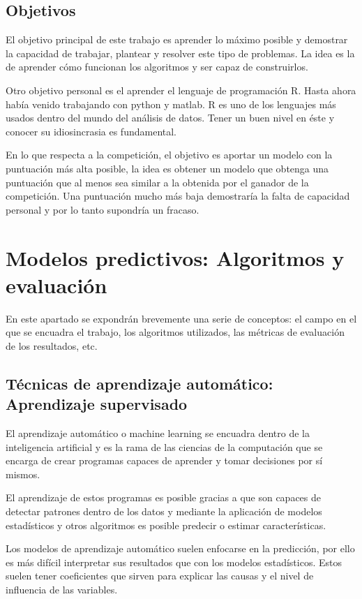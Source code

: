 \documentclass[11pt,a4paper,spanish]{article} %
\begin{document}
\subsection{Objetivos}
El objetivo principal de este trabajo es aprender lo máximo posible y demostrar la capacidad de trabajar, plantear y resolver este tipo de problemas. La idea es la de aprender cómo funcionan los algoritmos y ser capaz de construirlos. 

Otro objetivo personal es el aprender el lenguaje de programación R. Hasta ahora había venido trabajando con python y matlab. R es uno de los lenguajes más usados dentro del mundo del análisis de datos. Tener un buen nivel en éste y conocer su idiosincrasia es fundamental. 

En lo que respecta a la competición, el objetivo es aportar un modelo con la puntuación más alta posible, la idea es obtener un modelo que obtenga una puntuación que al menos sea similar a la obtenida por el ganador de la competición. Una puntuación mucho más baja demostraría la falta de capacidad personal y por lo tanto supondría un fracaso. 


\section{Modelos predictivos: Algoritmos y evaluación}

En este apartado se expondrán brevemente una serie de conceptos: el campo en el que se encuadra el trabajo, los algoritmos utilizados, las métricas de evaluación de los resultados, etc.


\subsection{Técnicas de aprendizaje automático: Aprendizaje supervisado}
El aprendizaje automático o machine learning se encuadra dentro de la inteligencia artificial y es la rama de las ciencias de la computación que se encarga de crear programas capaces de aprender y tomar decisiones por sí mismos. 

El aprendizaje de estos programas es posible gracias a que son capaces de detectar patrones dentro de los datos y mediante la aplicación de modelos estadísticos y otros algoritmos es posible predecir o estimar características. 

Los modelos de aprendizaje automático suelen enfocarse en la predicción, por ello es más difícil interpretar sus resultados que con los modelos estadísticos. Estos suelen tener coeficientes que sirven para explicar las causas y el nivel de influencia de las variables.
\end{document}
